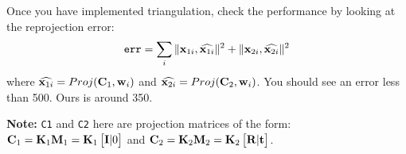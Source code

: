 Once you have implemented triangulation, check the performance by looking at the reprojection error:  
\begin{align*}
\texttt{err} = \sum_i \|{\bf x}_{1i}, \widehat{{\bf x}_{1i}}\|^2 + \|{\bf x}_{2i}, \widehat{{\bf x}_{2i}}\|^2    
\end{align*}
where $\widehat{{\bf x}_{1i}} = Proj(\mathbf{C}_1, {\bf w}_i)$ and $\widehat{{\bf x}_{2i}} = Proj(\mathbf{C}_2, {\bf w}_i)$. You should see an error less than 500. Ours is around 350. 

\textbf{Note: } \texttt{C1} and \texttt{C2} here are projection matrices of the form:
$\mathbf{C}_1 = \mathbf{K}_1\mathbf{M}_1 = \mathbf{K}_1 \begin{bmatrix}
{\bf I} | 0
\end{bmatrix} $ and $\mathbf{C}_2 =  \mathbf{K}_2\mathbf{M}_2 = \mathbf{K}_2 \begin{bmatrix}
{\bf R} | {\bf t}
\end{bmatrix}$.


